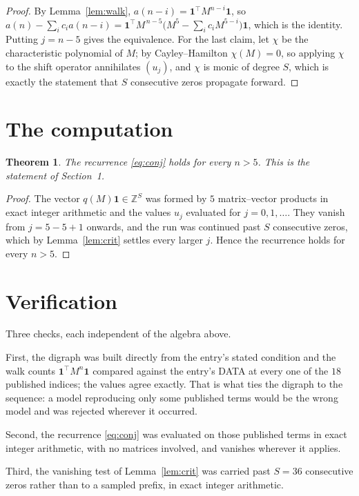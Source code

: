 \documentclass[11pt,a4paper]{article}
\theoremstyle{plain}
\newtheorem{theorem}{Theorem}
\theoremstyle{definition}
\begin{document}
\begin{proof}
By Lemma~\ref{lem:walk}, $a(n-i)=\mathbf{1}^{\!\top}M^{n-i}\mathbf{1}$, so
$a(n)-\sum_i c_i a(n-i)
=\mathbf{1}^{\!\top}M^{\,n-5}\bigl(M^{5}-\sum_i c_i M^{5-i}\bigr)
\mathbf{1}$, which is the identity. Putting $j=n-5$ gives the equivalence. For the
last claim, let $\chi$ be the characteristic polynomial of $M$; by Cayley--Hamilton
$\chi(M)=0$, so applying $\chi$ to the shift operator annihilates $(u_j)$, and $\chi$ is
monic of degree $S$, which is exactly the statement that $S$ consecutive zeros propagate
forward.
\end{proof}

\section{The computation}

\begin{theorem}
The recurrence \eqref{eq:conj} holds for every $n>5$. This is the statement of
Section~1.
\end{theorem}

\begin{proof}
The vector $q(M)\mathbf{1}\in\mathbb{Z}^{S}$ was formed by $5$ matrix--vector
products in exact integer arithmetic and the values $u_j$ evaluated for
$j=0,1,\dots$. They vanish from $j=5-5+1$ onwards, and the run was continued past
$S$ consecutive zeros, which by Lemma~\ref{lem:crit} settles every larger $j$. Hence the
recurrence holds for every $n>5$.
\end{proof}

\section{Verification}

Three checks, each independent of the algebra above.

First, the digraph was built directly from the entry's stated condition and the walk counts
$\mathbf{1}^{\!\top}M^{n}\mathbf{1}$ compared against the entry's DATA at every one of
the $18$ published indices; the values agree exactly. That is what ties the digraph to
the sequence: a model reproducing only some published terms would be the wrong model and
was rejected wherever it occurred.

Second, the recurrence \eqref{eq:conj} was evaluated on those published terms in exact
integer arithmetic, with no matrices involved, and vanishes wherever it applies.

Third, the vanishing test of Lemma~\ref{lem:crit} was carried past $S=36$ consecutive
zeros rather than to a sampled prefix, in exact integer arithmetic.
\end{document}
